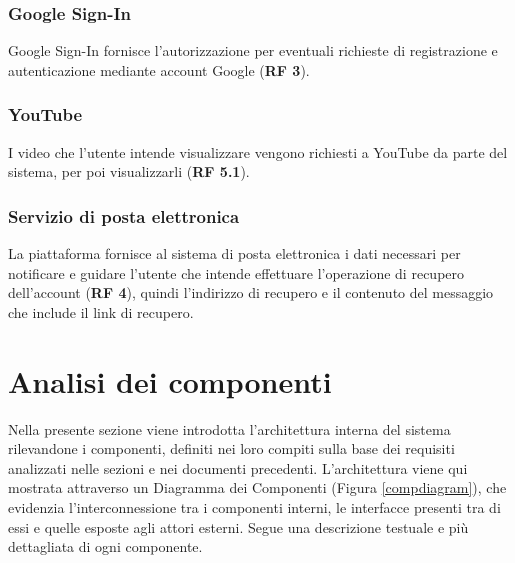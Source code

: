 \documentclass[11pt, a4paper]{article}
\theoremstyle{definition} %
\begin{document}
\subsubsection*{Google Sign-In}
Google Sign-In fornisce l'autorizzazione per eventuali richieste di
registrazione e autenticazione mediante account Google (\textbf{RF 3}).

\subsubsection*{YouTube}
I video che l'utente intende visualizzare vengono richiesti a YouTube da
parte del sistema, per poi visualizzarli (\textbf{RF 5.1}).

\subsubsection*{Servizio di posta elettronica}
La piattaforma fornisce al sistema di posta elettronica i dati necessari
per notificare e guidare l'utente che intende effettuare l'operazione di
recupero dell'account (\textbf{RF 4}), quindi l'indirizzo di recupero e
il contenuto del messaggio che include il link di recupero.



\newpage



\section{Analisi dei componenti}

Nella presente sezione viene introdotta l'architettura interna del sistema
rilevandone i componenti, definiti nei loro compiti sulla base dei requisiti
analizzati nelle sezioni e nei documenti precedenti. L'architettura viene
qui mostrata attraverso un Diagramma dei Componenti (Figura \ref{compdiagram}), che evidenzia
l'interconnessione tra i componenti interni, le interfacce presenti tra di
essi e quelle esposte agli attori esterni. Segue una descrizione testuale
e più dettagliata di ogni componente.
\end{document}
